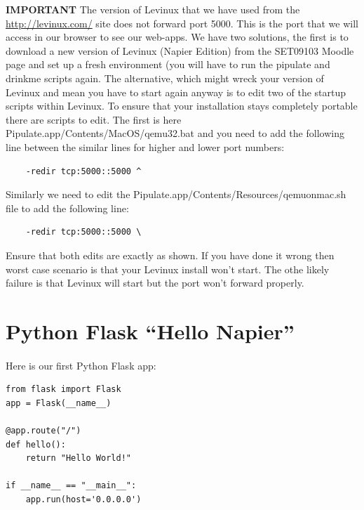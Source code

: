 \documentclass[12pt, a4paper, twoside]{book}
\begin{document}
\begin{framed}
\textbf{IMPORTANT} The version of Levinux that we have used from the \url{http://levinux.com/} site does not forward port 5000. This is the port that we will access in our browser to see our web-apps. We have two solutions, the first is to download a new version of Levinux (Napier Edition) from the SET09103 Moodle page and set up a fresh environment (you will have to run the pipulate and drinkme scripts again. The alternative, which might wreck your version of Levinux and mean you have to start again anyway is to edit two of the startup scripts within Levinux. To ensure that your installation stays completely portable there are scripts to edit. The first is here Pipulate.app/Contents/MacOS/qemu32.bat and you need to add the following line between the similar lines for higher and lower port numbers:
\begin{lstlisting}
    -redir tcp:5000::5000 ^
\end{lstlisting}
Similarly we need to edit the Pipulate.app/Contents/Resources/qemuonmac.sh file to add the following line:
\begin{lstlisting}
    -redir tcp:5000::5000 \
\end{lstlisting}
Ensure that both edits are exactly as shown. If you have done it wrong then worst case scenario is that your Levinux install won't start. The othe likely failure is that Levinux will start but the port won't forward properly.
\end{framed}

\section{Python Flask ``Hello Napier''}
\label{hello-napier}
\paragraph{} Here is our first Python Flask app:

\begin{lstlisting}
from flask import Flask
app = Flask(__name__)

@app.route("/")
def hello():
    return "Hello World!"

if __name__ == "__main__":
    app.run(host='0.0.0.0')
\end{lstlisting}
\end{document}
